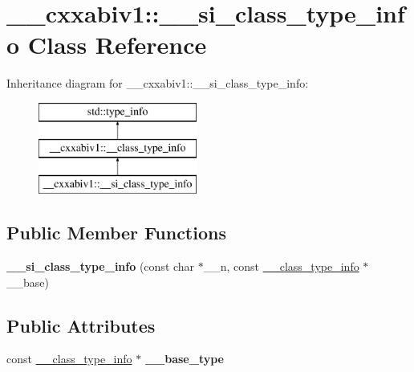 \hypertarget{class____cxxabiv1_1_1____si__class__type__info}{\section{\+\_\+\+\_\+cxxabiv1\+:\+:\+\_\+\+\_\+si\+\_\+class\+\_\+type\+\_\+info Class Reference}
\label{class____cxxabiv1_1_1____si__class__type__info}
}
Inheritance diagram for \+\_\+\+\_\+cxxabiv1\+:\+:\+\_\+\+\_\+si\+\_\+class\+\_\+type\+\_\+info\+:\begin{figure}[H]
\begin{center}
\leavevmode
\includegraphics[height=3.000000cm]{class____cxxabiv1_1_1____si__class__type__info}
\end{center}
\end{figure}
\subsection*{Public Member Functions}
\begin{DoxyCompactItemize}
\item 
\hypertarget{class____cxxabiv1_1_1____si__class__type__info_a1c6415da2aa99688ff3fabe8129b5d14}{{\bfseries \+\_\+\+\_\+si\+\_\+class\+\_\+type\+\_\+info} (const char $\ast$\+\_\+\+\_\+n, const \hyperlink{class____cxxabiv1_1_1____class__type__info}{\+\_\+\+\_\+class\+\_\+type\+\_\+info} $\ast$\+\_\+\+\_\+base)}\label{class____cxxabiv1_1_1____si__class__type__info_a1c6415da2aa99688ff3fabe8129b5d14}

\end{DoxyCompactItemize}
\subsection*{Public Attributes}
\begin{DoxyCompactItemize}
\item 
\hypertarget{class____cxxabiv1_1_1____si__class__type__info_aaa57290d466ba75d5242b30ba10af5e4}{const \hyperlink{class____cxxabiv1_1_1____class__type__info}{\+\_\+\+\_\+class\+\_\+type\+\_\+info} $\ast$ {\bfseries \+\_\+\+\_\+base\+\_\+type}}\label{class____cxxabiv1_1_1____si__class__type__info_aaa57290d466ba75d5242b30ba10af5e4}

\end{DoxyCompactItemize}
